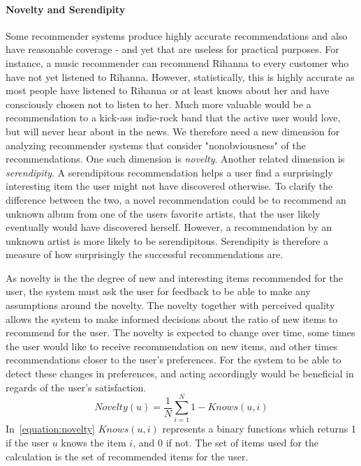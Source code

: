 \paragraph{Novelty and Serendipity}
Some recommender systems produce highly accurate recommendations and also have reasonable coverage - and yet that are useless for practical purposes. For instance, a music recommender can recommend Rihanna to every customer who have not yet listened to Rihanna. However, statistically, this is highly accurate as most people have listened to Rihanna or at least knows about her and have consciously chosen not to listen to her. Much more valuable would be a recommendation to a kick-ass indie-rock band that the active user would love, but will never hear about in the news. We therefore need a new dimension for analyzing recommender systems that consider "nonobviousness" of the recommendations. One such dimension is \emph{novelty}. Another related dimension is \emph{serendipity}. A serendipitous recommendation helps a user find a surprisingly interesting item the user might not have discovered otherwise. To clarify the difference between the two, a novel recommendation could be to recommend an unknown album from one of the users favorite artists, that the user likely eventually would have discovered herself. However, a recommendation by an unknown artist is more likely to be serendipitous. Serendipity is therefore a measure of how surprisingly the successful recommendations are.

As novelty is the the degree of new and interesting items recommended for the user, the system must ask the user for feedback to be able to make any assumptions around the novelty.
The novelty together with perceived quality allows the system to make informed decisions about the ratio of new items to recommend for the user.
The novelty is expected to change over time, some times the user would like to receive recommendation on new items, and other times recommendations closer to the user's preferences.
For the system to be able to detect these changes in preferences, and acting accordingly would be beneficial in regards of the user's satisfaction.
\begin{equation}
    Novelty(u) = \frac{1}{N}\sum_{i=1}^{N}{1 - Knows(u,i)}
    \label{equation:novelty}
\end{equation}
In~\ref{equation:novelty} $Knows(u,i)$ represents a binary functions which returns 1 if the user $u$ knows the item $i$, and 0 if not.
The set of items used for the calculation is the set of recommended items for the user.

